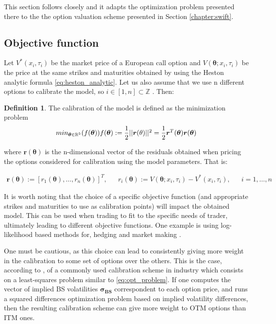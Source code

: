 \documentclass[12,twoside]{mammeTFM}
\theoremstyle{definition}
\newtheorem{definition}[thm]{Definition}
\theoremstyle{remark}
\newcommand{\Z}{\ensuremath{\mathbb{Z}}}
\newcommand{\R}{\ensuremath{\mathbb{R}}}
\begin{document}
This section follows closely \cite{cui17} and it adapts the optimization problem presented there to the the option valuation scheme presented in Section \ref{chapter:swift}.

\subsection{Objective function}
Let $V^*(x_i, \tau_i)$ be the market price of a European call option and
 $V(\boldsymbol{\theta}; x_i, \tau_i)$ be the price at the same strikes and maturities obtained by using the Heston analytic formula \ref{eq:heston_analytic}. Let us also assume that we use n different options to calibrate the model, so 
 $i \in [1,n] \subset \Z$
 . Then:
\begin{definition} The calibration of the model is defined as the minimization problem 
\begin{equation} \label{eq:opt_problem}
min_{\boldsymbol{\theta} \in \R^5} (f(\boldsymbol{\theta}))$$ $$f(\boldsymbol{\theta}) := \dfrac{1}{2}||\boldsymbol{r}(\theta)||^2 = \dfrac{1}{2} \boldsymbol{r}^T(\boldsymbol{\theta})\boldsymbol{r}(\boldsymbol{\theta})
\end{equation}
\end{definition}

where $\boldsymbol{r}(\boldsymbol{\theta})$ is the n-dimensional vector of the residuals obtained when pricing the options considered for calibration using the model parameters. That is:

\begin{align} \label{eq:opt_problem2}
\boldsymbol{r}(\boldsymbol{\theta}) := \left[r_1(\boldsymbol{\theta}), \ldots, r_n(\boldsymbol{\theta}) \right]^T, 
&& r_i(\boldsymbol{\theta}) :=  V(\boldsymbol{\theta}; x_i, \tau_i) - V^*(x_i, \tau_i), && i = 1, \ldots, n
\end{align}

It is worth noting that the choice of a specific objective function (and appropriate strikes and maturities to use as calibration points) will impact the obtained model. This can be used when trading to fit to the specific needs of trader, ultimately leading to different objective functions. One example is using log-likelihood based methods for, hedging and market making \cite{chr02}. 

One must be cautious, as this choice can lead to consistently giving more weight in the calibration to some set of options over the others. This is the case, according to \cite{cui17}, of a commonly used calibration scheme in industry which consists on a least-squares problem similar to \ref{eq:opt_problem}. If one computes the vector of implied BS volatilities $\boldsymbol{\sigma_{BS}}$ correspondent to each option price, and runs a squared differences optimization problem based on implied volatility differences, then the resulting calibration scheme can give more weight to OTM options than ITM ones.
\end{document}
